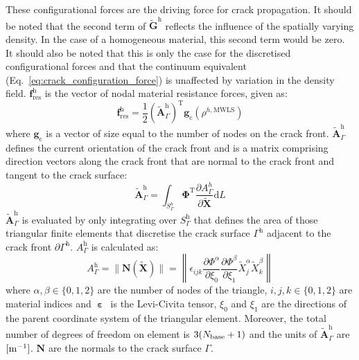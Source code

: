 \documentclass[onecolumn]{svjour3}
\begin{document}
These configurational forces are the driving force for crack propagation. It should be noted that the second term of $\tilde{\mathbf{G}}^\textrm{h}$ reflects the influence of the spatially varying density. In the case of a homogeneous material, this second term would be zero. It should also be noted that this is only the case for the discretised configurational forces and that the continuum equivalent (Eq.~\ref{eq:crack_configuration_force}) is unaffected by variation in the density field.
% 
$\mathbf{f}^\textrm{h}_\textrm{res}$ is the vector of nodal material resistance forces, given as:
\begin{equation}
\mathbf{f}^\textrm{h}_\textrm{res}=\frac{1}{2}\left(\tilde{\mathbf{A}}_\Gamma^\textrm{h}\right)^\textrm{T}\mathbf{g}_\textrm{c}(\rho^{h,\textrm{MWLS}})
\end{equation}
where $\mathbf{g}_\textrm{c}$ is a vector of size equal to the number of nodes on the crack front. $\tilde{\mathbf{A}}_\Gamma^\textrm{h}$ defines the current orientation of the crack front and is a matrix comprising direction vectors along the crack front that are normal to the crack front and tangent to the crack surface:
\begin{equation}
\tilde{\mathbf{A}}_\Gamma^\textrm{h} = 
\int_{S^h_\Gamma}
\pmb{\Phi}^\textrm{T} 
\frac{\partial {A}^h_{\Gamma}}{
\partial \tilde{\mathbf{X}}}
\textrm{d}L
\end{equation}
$\tilde{\mathbf{A}}_\Gamma^\textrm{h}$ is evaluated by only integrating over $S_\Gamma^\textrm{h}$ that defines the area of those triangular finite elements that discretise the crack surface $\Gamma^\textrm{h}$ adjacent to the crack front $\partial\Gamma^\textrm{h}$.
$A^\textrm{h}_{\Gamma}$ is calculated as:
\begin{equation}
A^\textrm{h}_{\Gamma} = 	
	\| \mathbf{N}(\tilde{\mathbf{X}}) \|
=
\left\| 
\epsilon_{ijk}
\frac{\partial \Phi^\alpha}{\partial \xi_0}  
\frac{\partial \Phi^\beta}{\partial \xi_1} 
\tilde{X}^\alpha_j
\tilde{X}^\beta_k
\right\|
\end{equation}
where $\alpha, \beta \in \{0, 1, 2\}$ are the number of nodes of the triangle,
$i,j,k \in \{0,1,2\}$ are material indices and $\boldsymbol{\upepsilon}$~is the Levi-Civita tensor, $\xi_0$ and $\xi_1$ are the directions of the parent coordinate system of the triangular element. 
Moreover, the total number of degrees of freedom on element is $3(N_{\rm{base}}+1)$ and the units of $\tilde{\mathbf{A}}_\Gamma^\textrm{h}$ are $[{\rm m}^{-1}]$. $\mathbf{N}$ are the normals to the crack surface $\Gamma$.
\end{document}
